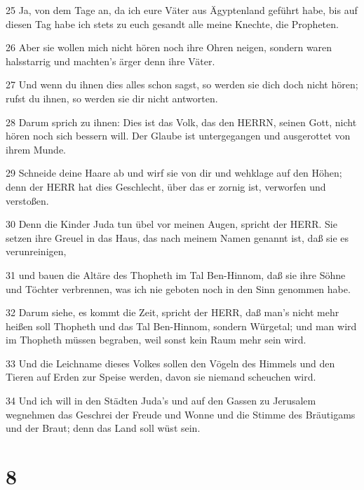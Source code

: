 \par 25 Ja, von dem Tage an, da ich eure Väter aus Ägyptenland geführt habe, bis auf diesen Tag habe ich stets zu euch gesandt alle meine Knechte, die Propheten.
\par 26 Aber sie wollen mich nicht hören noch ihre Ohren neigen, sondern waren halsstarrig und machten's ärger denn ihre Väter.
\par 27 Und wenn du ihnen dies alles schon sagst, so werden sie dich doch nicht hören; rufst du ihnen, so werden sie dir nicht antworten.
\par 28 Darum sprich zu ihnen: Dies ist das Volk, das den HERRN, seinen Gott, nicht hören noch sich bessern will. Der Glaube ist untergegangen und ausgerottet von ihrem Munde.
\par 29 Schneide deine Haare ab und wirf sie von dir und wehklage auf den Höhen; denn der HERR hat dies Geschlecht, über das er zornig ist, verworfen und verstoßen.
\par 30 Denn die Kinder Juda tun übel vor meinen Augen, spricht der HERR. Sie setzen ihre Greuel in das Haus, das nach meinem Namen genannt ist, daß sie es verunreinigen,
\par 31 und bauen die Altäre des Thopheth im Tal Ben-Hinnom, daß sie ihre Söhne und Töchter verbrennen, was ich nie geboten noch in den Sinn genommen habe.
\par 32 Darum siehe, es kommt die Zeit, spricht der HERR, daß man's nicht mehr heißen soll Thopheth und das Tal Ben-Hinnom, sondern Würgetal; und man wird im Thopheth müssen begraben, weil sonst kein Raum mehr sein wird.
\par 33 Und die Leichname dieses Volkes sollen den Vögeln des Himmels und den Tieren auf Erden zur Speise werden, davon sie niemand scheuchen wird.
\par 34 Und ich will in den Städten Juda's und auf den Gassen zu Jerusalem wegnehmen das Geschrei der Freude und Wonne und die Stimme des Bräutigams und der Braut; denn das Land soll wüst sein.

\chapter{8}

